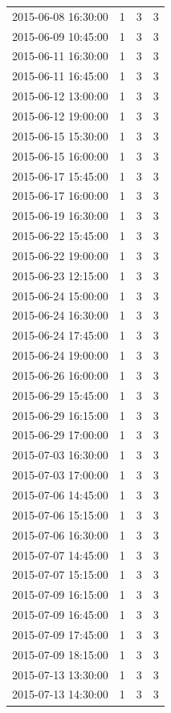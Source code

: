 \begin{tabular}{lrrr}
2015-06-08 16:30:00 & 1 & 3 & 3 \\
2015-06-09 10:45:00 & 1 & 3 & 3 \\
2015-06-11 16:30:00 & 1 & 3 & 3 \\
2015-06-11 16:45:00 & 1 & 3 & 3 \\
2015-06-12 13:00:00 & 1 & 3 & 3 \\
2015-06-12 19:00:00 & 1 & 3 & 3 \\
2015-06-15 15:30:00 & 1 & 3 & 3 \\
2015-06-15 16:00:00 & 1 & 3 & 3 \\
2015-06-17 15:45:00 & 1 & 3 & 3 \\
2015-06-17 16:00:00 & 1 & 3 & 3 \\
2015-06-19 16:30:00 & 1 & 3 & 3 \\
2015-06-22 15:45:00 & 1 & 3 & 3 \\
2015-06-22 19:00:00 & 1 & 3 & 3 \\
2015-06-23 12:15:00 & 1 & 3 & 3 \\
2015-06-24 15:00:00 & 1 & 3 & 3 \\
2015-06-24 16:30:00 & 1 & 3 & 3 \\
2015-06-24 17:45:00 & 1 & 3 & 3 \\
2015-06-24 19:00:00 & 1 & 3 & 3 \\
2015-06-26 16:00:00 & 1 & 3 & 3 \\
2015-06-29 15:45:00 & 1 & 3 & 3 \\
2015-06-29 16:15:00 & 1 & 3 & 3 \\
2015-06-29 17:00:00 & 1 & 3 & 3 \\
2015-07-03 16:30:00 & 1 & 3 & 3 \\
2015-07-03 17:00:00 & 1 & 3 & 3 \\
2015-07-06 14:45:00 & 1 & 3 & 3 \\
2015-07-06 15:15:00 & 1 & 3 & 3 \\
2015-07-06 16:30:00 & 1 & 3 & 3 \\
2015-07-07 14:45:00 & 1 & 3 & 3 \\
2015-07-07 15:15:00 & 1 & 3 & 3 \\
2015-07-09 16:15:00 & 1 & 3 & 3 \\
2015-07-09 16:45:00 & 1 & 3 & 3 \\
2015-07-09 17:45:00 & 1 & 3 & 3 \\
2015-07-09 18:15:00 & 1 & 3 & 3 \\
2015-07-13 13:30:00 & 1 & 3 & 3 \\
2015-07-13 14:30:00 & 1 & 3 & 3 \\

\end{tabular}
